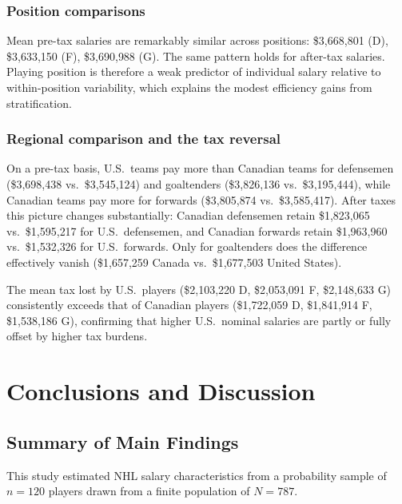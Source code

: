 \documentclass[12pt]{article}
\begin{document}
\subsubsection*{Position comparisons}

Mean pre-tax salaries are remarkably similar across positions:
\$3{,}668{,}801 (D), \$3{,}633{,}150 (F), \$3{,}690{,}988 (G).
The same pattern holds for after-tax salaries.
Playing position is therefore a weak predictor of individual salary relative to
within-position variability, which explains the modest efficiency gains from
stratification.

\subsubsection*{Regional comparison and the tax reversal}

On a pre-tax basis, U.S.\ teams pay more than Canadian teams for defensemen
(\$3{,}698{,}438 vs.\ \$3{,}545{,}124) and goaltenders
(\$3{,}826{,}136 vs.\ \$3{,}195{,}444),
while Canadian teams pay more for forwards
(\$3{,}805{,}874 vs.\ \$3{,}585{,}417).
After taxes this picture changes substantially:
Canadian defensemen retain \$1{,}823{,}065 vs.\ \$1{,}595{,}217 for U.S.\ defensemen,
and Canadian forwards retain \$1{,}963{,}960 vs.\ \$1{,}532{,}326 for U.S.\ forwards.
Only for goaltenders does the difference effectively vanish
(\$1{,}657{,}259 Canada vs.\ \$1{,}677{,}503 United States).

The mean tax lost by U.S.\ players (\$2{,}103{,}220 D, \$2{,}053{,}091 F,
\$2{,}148{,}633 G) consistently exceeds that of Canadian players
(\$1{,}722{,}059 D, \$1{,}841{,}914 F, \$1{,}538{,}186 G),
confirming that higher U.S.\ nominal salaries are partly or fully offset by higher
tax burdens.

\newpage

\section{Conclusions and Discussion}
\label{sec:conclusions}

\subsection{Summary of Main Findings}

This study estimated NHL salary characteristics from a probability sample of $n = 120$
players drawn from a finite population of $N = 787$.
\end{document}
